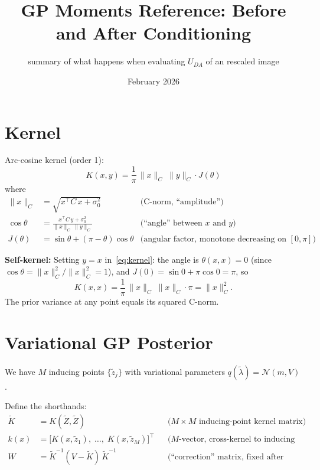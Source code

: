 \documentclass[11pt]{article}
\title{GP Moments Reference: Before and After Conditioning}
\author{summary of what happens when evaluating $U_{DA}$ of an rescaled image }
\date{February 2026}
\begin{document}
\maketitle

\section{Kernel}

Arc-cosine kernel (order 1):
\begin{equation}\label{eq:kernel}
    K(x, y) = \frac{1}{\pi}\,\|x\|_C\;\|y\|_C \cdot J(\theta)
\end{equation}
where
\begin{align}
    \|x\|_C &= \sqrt{x^\top\! C\, x + \sigma_0^2}
        &\text{(C-norm, ``amplitude'')} \\[4pt]
    \cos\theta &= \frac{x^\top\! C\, y + \sigma_0^2}{\|x\|_C\;\|y\|_C}
        &\text{(``angle'' between $x$ and $y$)} \\[4pt]
    J(\theta) &= \sin\theta + (\pi - \theta)\cos\theta
        &\text{(angular factor, monotone decreasing on $[0,\pi]$)}
\end{align}

\textbf{Self-kernel:} Setting $y = x$ in~\eqref{eq:kernel}:
the angle is $\theta(x,x) = 0$ (since $\cos\theta = \|x\|_C^2 / \|x\|_C^2 = 1$),
and $J(0) = \sin 0 + \pi\cos 0 = \pi$, so
\begin{equation}
    K(x, x) = \frac{1}{\pi}\,\|x\|_C\;\|x\|_C \cdot \pi = \|x\|_C^2.
\end{equation}
The prior variance at any point equals its squared C-norm.

\section{Variational GP Posterior}

We have $M$ inducing points $\{\tilde z_j\}$ with variational parameters
$q(\tilde\lambda) = \mathcal{N}(m, V)$.

Define the shorthands:
\begin{align}
    \tilde K &= K(\tilde Z, \tilde Z)
        &&\text{($M\!\times\!M$ inducing-point kernel matrix)} \\
    k(x) &= \bigl[K(x, \tilde z_1),\;\ldots,\;K(x, \tilde z_M)\bigr]^\top
        &&\text{($M$-vector, cross-kernel to inducing points)} \\
    W &= \tilde K^{-1}(V - \tilde K)\,\tilde K^{-1}
        &&\text{(``correction'' matrix, fixed after training)}
\end{align}
\end{document}
